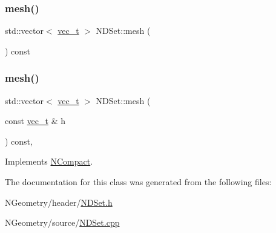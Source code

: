 \mbox{\label{class_n_d_set_a18273bfd133548e2012d1c8bd7cf566c}} 
\subsubsection{\texorpdfstring{mesh()}{mesh()}\hspace{0.1cm}{\footnotesize\ttfamily [1/2]}}
{\footnotesize\ttfamily std\+::vector$<$ \mbox{\hyperlink{group___n_algebra_ga0a2cfc67e738a3d73e4f12098c4c07f6}{vec\+\_\+t}} $>$ N\+D\+Set\+::mesh (\begin{DoxyParamCaption}{ }\end{DoxyParamCaption}) const}

\mbox{\label{class_n_d_set_ae57fe6ad1422876fa4256a28c3a26a13}} 
\subsubsection{\texorpdfstring{mesh()}{mesh()}\hspace{0.1cm}{\footnotesize\ttfamily [2/2]}}
{\footnotesize\ttfamily std\+::vector$<$ \mbox{\hyperlink{group___n_algebra_ga0a2cfc67e738a3d73e4f12098c4c07f6}{vec\+\_\+t}} $>$ N\+D\+Set\+::mesh (\begin{DoxyParamCaption}\item[{const \mbox{\hyperlink{group___n_algebra_ga0a2cfc67e738a3d73e4f12098c4c07f6}{vec\+\_\+t}} \&}]{h }\end{DoxyParamCaption}) const\hspace{0.3cm}{\ttfamily [override]}, {\ttfamily [virtual]}}



Implements \mbox{\hyperlink{class_n_compact_ad4cdc60c75ca433c63f44ec13063e2fe}{N\+Compact}}.



The documentation for this class was generated from the following files\+:\begin{DoxyCompactItemize}
\item 
N\+Geometry/header/\mbox{\hyperlink{_n_d_set_8h}{N\+D\+Set.\+h}}\item 
N\+Geometry/source/\mbox{\hyperlink{_n_d_set_8cpp}{N\+D\+Set.\+cpp}}\end{DoxyCompactItemize}

